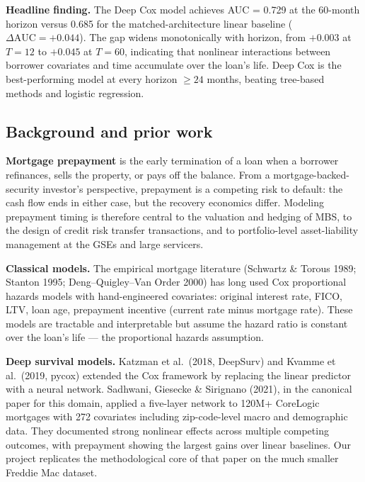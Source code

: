 \documentclass[11pt,a4paper]{article}
\begin{document}
\textbf{Headline finding.} The Deep Cox model achieves AUC = 0.729 at the 60-month horizon versus 0.685 for the matched-architecture linear baseline ($\Delta\text{AUC} = +0.044$). The gap widens monotonically with horizon, from $+0.003$ at $T{=}12$ to $+0.045$ at $T{=}60$, indicating that nonlinear interactions between borrower covariates and time accumulate over the loan's life. Deep Cox is the best-performing model at every horizon $\geq 24$ months, beating tree-based methods and logistic regression.

\subsection{Background and prior work}

\textbf{Mortgage prepayment} is the early termination of a loan when a borrower refinances, sells the property, or pays off the balance. From a mortgage-backed-security investor's perspective, prepayment is a competing risk to default: the cash flow ends in either case, but the recovery economics differ. Modeling prepayment timing is therefore central to the valuation and hedging of MBS, to the design of credit risk transfer transactions, and to portfolio-level asset-liability management at the GSEs and large servicers.

\textbf{Classical models.} The empirical mortgage literature (Schwartz \& Torous 1989; Stanton 1995; Deng--Quigley--Van Order 2000) has long used Cox proportional hazards models with hand-engineered covariates: original interest rate, FICO, LTV, loan age, prepayment incentive (current rate minus mortgage rate). These models are tractable and interpretable but assume the hazard ratio is constant over the loan's life --- the proportional hazards assumption.

\textbf{Deep survival models.} Katzman et al.\ (2018, DeepSurv) and Kvamme et al.\ (2019, pycox) extended the Cox framework by replacing the linear predictor with a neural network. Sadhwani, Giesecke \& Sirignano (2021), in the canonical paper for this domain, applied a five-layer network to 120M+ CoreLogic mortgages with 272 covariates including zip-code-level macro and demographic data. They documented strong nonlinear effects across multiple competing outcomes, with prepayment showing the largest gains over linear baselines. Our project replicates the methodological core of that paper on the much smaller Freddie Mac dataset.

\end{document}
